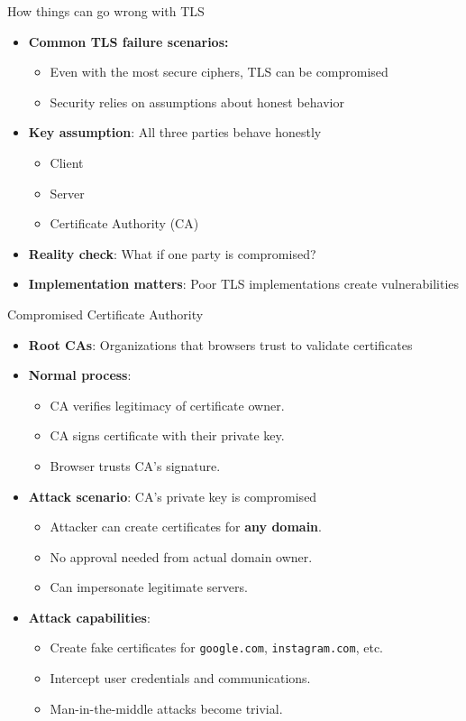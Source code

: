\documentclass[aspectratio=169, lualatex, handout]{beamer}
\begin{document}
\begin{frame}{How things can go wrong with TLS}
	\begin{itemize}[<+->]
		\item \textbf{Common TLS failure scenarios:}
		      \begin{itemize}
			      \item Even with the most secure ciphers, TLS can be compromised
			      \item Security relies on assumptions about honest behavior
		      \end{itemize}
		\item \textbf{Key assumption}: All three parties behave honestly
		      \begin{itemize}
			      \item Client
			      \item Server
			      \item Certificate Authority (CA)
		      \end{itemize}
		\item \textbf{Reality check}: What if one party is compromised?
		\item \textbf{Implementation matters}: Poor TLS implementations create vulnerabilities
	\end{itemize}
\end{frame}

\begin{frame}{Compromised Certificate Authority}
	\begin{itemize}[<+->]
		\item \textbf{Root CAs}: Organizations that browsers trust to validate certificates
		\item \textbf{Normal process}:
		      \begin{itemize}
			      \item CA verifies legitimacy of certificate owner.
			      \item CA signs certificate with their private key.
			      \item Browser trusts CA's signature.
		      \end{itemize}
		\item \textbf{Attack scenario}: CA's private key is compromised
		      \begin{itemize}
			      \item Attacker can create certificates for \textbf{any domain}.
			      \item No approval needed from actual domain owner.
			      \item Can impersonate legitimate servers.
		      \end{itemize}
		\item \textbf{Attack capabilities}:
		      \begin{itemize}
			      \item Create fake certificates for \texttt{google.com}, \texttt{instagram.com}, etc.
			      \item Intercept user credentials and communications.
			      \item Man-in-the-middle attacks become trivial.
		      \end{itemize}
	\end{itemize}
\end{frame}
\end{document}
